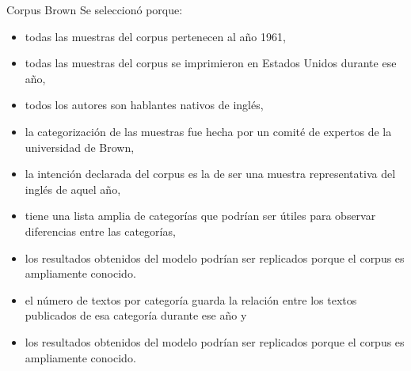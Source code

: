 \documentclass[presentation]{beamer}
\begin{document}
\begin{frame}[label={sec:orgace1785}]{Corpus Brown}
Se seleccionó porque:
\small
\begin{itemize}
\item todas las muestras del corpus pertenecen al año 1961,
\item todas las muestras del corpus se imprimieron en Estados Unidos durante ese año,
\item todos los autores son hablantes nativos de inglés,
\item la categorización de las muestras fue hecha por un comité de expertos de la universidad de Brown,
\item la intención declarada del corpus es la de ser una muestra representativa del inglés de aquel año,
\item tiene una lista amplia de categorías que podrían ser útiles para observar diferencias entre las categorías,
\item los resultados obtenidos del modelo podrían ser replicados porque el corpus es ampliamente conocido.
\item el número de textos por categoría guarda la relación entre los textos publicados de esa categoría durante ese año y
\item los resultados obtenidos del modelo podrían ser replicados porque el corpus es ampliamente conocido.
\end{itemize}
\normalsize
\end{frame}
\end{document}
